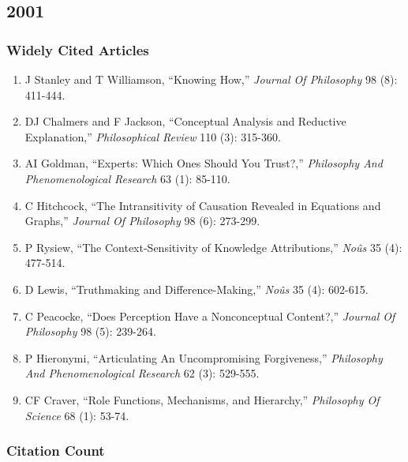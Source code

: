 \documentclass[
  10pt,
  letterpaper,
  DIV=11,
  numbers=noendperiod,
  twoside]{scrartcl}
\providecommand{\tightlist}{%
  \setlength{\itemsep}{0pt}\setlength{\parskip}{0pt}}\usepackage{longtable,booktabs,array}
\begin{document}
\newpage

\subsection{2001}\label{sec-s2001}

\subsubsection*{Widely Cited Articles}\label{widely-cited-articles-25}

\begin{enumerate}
\def\labelenumi{\arabic{enumi}.}
\tightlist
\item
  J Stanley and T Williamson, ``Knowing How,'' \emph{Journal Of
  Philosophy} 98 (8): 411-444.
\item
  DJ Chalmers and F Jackson, ``Conceptual Analysis and Reductive
  Explanation,'' \emph{Philosophical Review} 110 (3): 315-360.
\item
  AI Goldman, ``Experts: Which Ones Should You Trust?,''
  \emph{Philosophy And Phenomenological Research} 63 (1): 85-110.
\item
  C Hitchcock, ``The Intransitivity of Causation Revealed in Equations
  and Graphs,'' \emph{Journal Of Philosophy} 98 (6): 273-299.
\item
  P Rysiew, ``The Context-Sensitivity of Knowledge Attributions,''
  \emph{Noûs} 35 (4): 477-514.
\item
  D Lewis, ``Truthmaking and Difference-Making,'' \emph{Noûs} 35 (4):
  602-615.
\item
  C Peacocke, ``Does Perception Have a Nonconceptual Content?,''
  \emph{Journal Of Philosophy} 98 (5): 239-264.
\item
  P Hieronymi, ``Articulating An Uncompromising Forgiveness,''
  \emph{Philosophy And Phenomenological Research} 62 (3): 529-555.
\item
  CF Craver, ``Role Functions, Mechanisms, and Hierarchy,''
  \emph{Philosophy Of Science} 68 (1): 53-74.
\end{enumerate}

\subsubsection*{Citation Count}\label{sec-count-2001}
\end{document}
